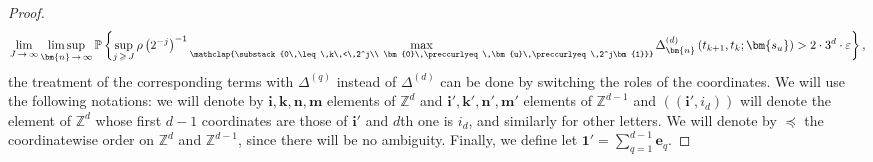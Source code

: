 \documentclass[AHL,Unicode,longabstracts,published]{cedram}
\newcommand\PP{\mathbb{P}}
\newcommand\Z{\mathbb{Z}}
\newcommand{\pr}[1]{(#1)}
\newcommand\eps{\varepsilon}
\newcommand{\gr}[1]{\bm{#1}}
\newcommand{\gri}{\bm{i}}
\newcommand{\grn}{\bm{n}}
\newcommand{\grm}{\bm{m}}
\newcommand{\gru}{\bm{u}}
\newcommand{\grk}{\bm{k}}
\newcommand{\imd}{\preccurlyeq}
\begin{document}
\begin{proof}
\begin{equation}
\lim_{J\,\to\,\infty}\limsup_{\grn\,\to\,\infty}
\PP\left\{\sup_{j\,\geqslant\,J}\rho\left(2^{-j}\right)^{-1}
\max_{\mathclap{\substack{0\,\leq\,k\,<\,2^j\\
\gr{0}\,\imd\,\gru\,\imd\,2^j\gr{1}}}} \Delta^{(d)}_{\grn}\left(t_{k+1},t_k;
\gr{s_u}\right)>2\cdot 3^d\cdot \eps\right\},
\end{equation}
the treatment of the corresponding terms with $\Delta^{(q)}$ instead of $\Delta^{(d)}$ can be done by switching the roles of the coordinates. We will use the following notations: we will denote by $\gri,\grk,\grn,\grm$ elements of $\Z^d$ and $\gr{i'},\gr{k'},\gr{n'},\gr{m'}$ elements of $\Z^{d-1}$ and $\pr{\pr{\gr{i'},i_d}}$ will denote the element of $\Z^d$ whose first $d-1$ coordinates are those of $\gr{i'}$ and $d$th one is $i_d$, and similarly for other letters. We will denote by $\imd$ the coordinatewise order on $\Z^d$ and $\Z^{d-1}$, since there will be no ambiguity. Finally, we define let $\gr{1'}=\sum_{q=1}^{d-1}\gr{e}_q$.


\end{proof}
\end{document}
